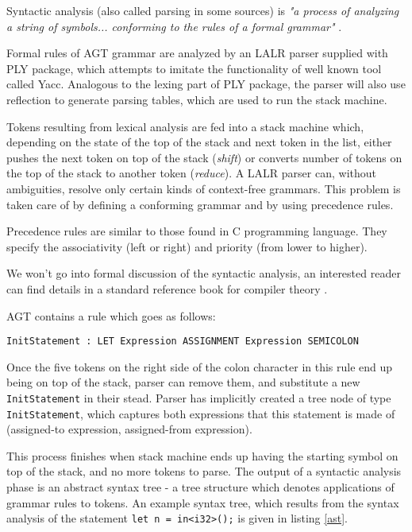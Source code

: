 \documentclass[times, utf8, diplomski]{fer}
\theoremstyle{definition}
\newcommand{\textcode}[3]{
    
}
\begin{document}
Syntactic analysis (also called parsing in some sources) is \textit{"a process of 
analyzing a string of symbols... conforming to the rules of a formal grammar"} \citep{c_parsing_def}. 

Formal rules of AGT grammar are analyzed by an LALR parser supplied with PLY package, which attempts
to imitate the functionality of well known tool called Yacc. Analogous to the lexing part of PLY package, 
the parser will also use reflection to generate parsing tables, which are used to run the stack machine.

Tokens resulting from lexical analysis are fed into a stack machine which,
depending on the state of the top of the stack and next token in the list,
either pushes the next token on top of the stack (\textit{shift}) or converts
number of tokens on the top of the stack to another token (\textit{reduce}).
A LALR parser can, without ambiguities, resolve only certain kinds of context-free grammars.
This problem is taken care of by defining a conforming grammar and by using precedence rules.

\textcode{\resdir/compiler/prio}{prio}{Precedence rules}

Precedence rules are similar to those found in C programming language.
They specify the associativity (left or right) and priority (from lower to higher).

We won't go into formal discussion of the syntactic analysis,
an interested reader can find details in a standard reference book for
compiler theory \citep{c_compilers_book}. 

AGT contains a rule which goes as follows: 

\begin{center}
\texttt{InitStatement : LET Expression ASSIGNMENT Expression SEMICOLON}
\end{center}

Once the five tokens on the right side of the colon character in this rule end up being
on top of the stack, parser can remove them, and substitute a new \texttt{InitStatement} in their stead.
Parser has implicitly created a tree node of type \texttt{InitStatement}, which captures both expressions that
this statement is made of (assigned-to expression, assigned-from expression).

This process finishes when stack machine ends up having the starting symbol on top of the stack,
and no more tokens to parse. 
The output of a syntactic analysis phase is an abstract syntax tree - a tree structure
which denotes applications of grammar rules to tokens. An example syntax tree, which
results from the syntax analysis of the statement \texttt{let n = in<i32>();} is given in listing \ref{ast}.
\end{document}
